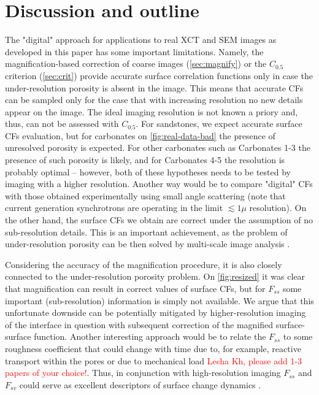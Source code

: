 \documentclass[reprint,amsmath,amssymb,aps,pre,showkeys,showpacs]{revtex4-1}
\begin{document}
\section{Discussion and outline}
\label{sec:outline}
The "digital" approach for applications to real XCT and SEM images as developed
in this paper has some important limitations. Namely, the magnification-based
correction of coarse images (\cref{sec:magnify}) or the $C_{0.5}$ criterion
(\cref{sec:crit}) provide accurate surface correlation functions only in case
the under-resolution porosity is absent in the image. This means that accurate
CFs can be sampled only for the case that with increasing resolution no new
details appear on the image. The ideal imaging resolution is not known a priory
and, thus, can not be assessed with $C_{0.5}$. For sandstones, we expect
accurate surface CFs evaluation, but for carbonates on \cref{fig:real-data-bad}
the presence of unresolved porosity is expected. For other carbonates such as
Carbonates 1-3 the presence of such porosity is likely, and for Carbonates 4-5
the resolution is probably optimal -- however, both of these hypotheses needs to
be tested by imaging with a higher resolution. Another way would be to compare
"digital" CFs with those obtained experimentally using small angle scattering
(note that current generation synchrotrons are operating in the limit
$\lesssim 1 \mu$ resolution). On the other hand, the surface CFs we obtain are
correct under the assumption of no sub-resolution details. This is an important
achievement, as the problem of under-resolution porosity can be then solved by
multi-scale image analysis \cite{moctezuma2002,SciRep1}.

Considering the accuracy of the magnification procedure, it is also closely
connected to the under-resolution porosity problem. On \cref{fig:resized}
it was clear that magnification can result in correct values of surface CFs, but
for $F_{ss}$ some important (sub-resolution) information is simply not
available. We argue that this unfortunate downside can be potentially mitigated
by higher-resolution imaging of the interface in question with subsequent
correction of the magnified surface-surface function. Another interesting
approach would be to relate the $F_{ss}$ to some roughness coefficient that
could change with time due to, for example, reactive transport within the pores
\cite{godinho2016,noiriel2021,prokhorov2022} or due to mechanical load %
\textcolor{red}{Lesha Kh, please add 1-3 papers of your choice!}. Thus, in
conjunction with high-resolution imaging $F_{ss}$ and $F_{sv}$ could serve as
excellent descriptors of surface change dynamics \cite{chen2022}.
\end{document}
